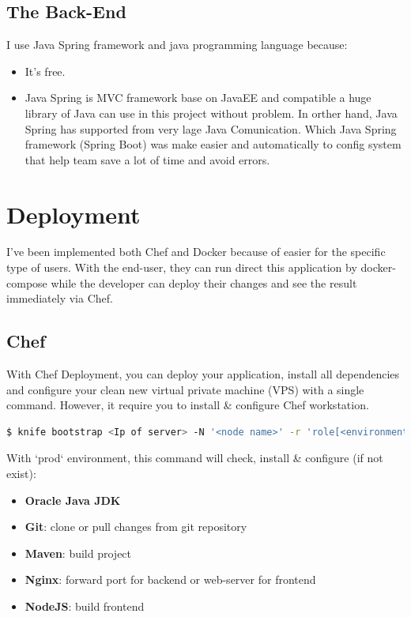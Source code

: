 \documentclass[a4paper,12pt]{article}
\begin{document}
\subsection{The Back-End}
I use Java Spring framework and java programming language because:
\begin{itemize}
	\item It's free.
	\item Java Spring is MVC framework base on JavaEE and compatible a huge library of Java can use in this project without problem. In orther hand, Java Spring has supported from very lage Java Comunication. Which Java Spring framework (Spring Boot) was make easier and automatically to config system that help team save a lot of time and avoid errors.
\end{itemize}

\section{Deployment}
I've been implemented both Chef and Docker because of easier for the specific type of users.  With the end-user, they can run direct this application by docker-compose while the developer can deploy their changes and see the result immediately via Chef.
\subsection{Chef}
With Chef Deployment, you can deploy your application, install all dependencies and  configure your clean new virtual private machine (VPS) with a single command. However, it require you to install \& configure Chef workstation. 
\\
\begin{lstlisting}[language=bash]
  $ knife bootstrap <Ip of server> -N '<node name>' -r 'role[<environment>]' --ssh-user <user name on node> --sudo --ssh-identity-file <ssh private credential> --secret-file <location of secret file>
\end{lstlisting}

With `prod` environment, this command will check, install \& configure (if not exist):
\begin{itemize}
	\item \textbf{Oracle Java JDK}
	\item \textbf{Git}: clone or pull changes from git repository
	\item \textbf{Maven}: build project
	\item \textbf{Nginx}: forward port for backend or web-server for frontend
	\item \textbf{NodeJS}: build frontend
\end{itemize}
\end{document}
